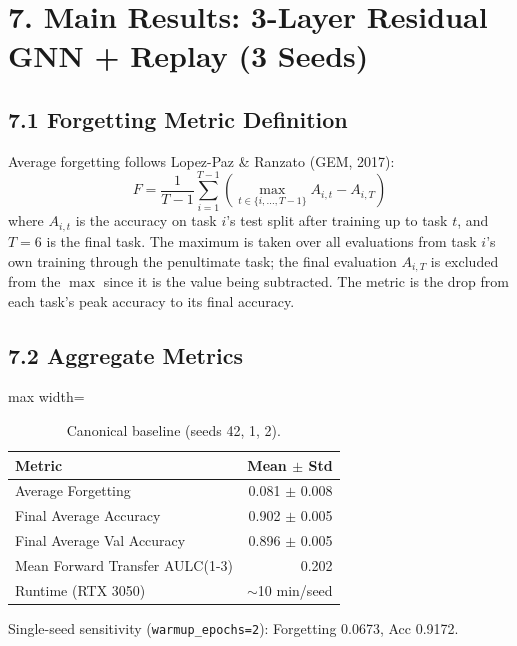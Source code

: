 \documentclass[11pt,a4paper]{article}
\begin{document}
\section*{7. Main Results: 3-Layer Residual GNN + Replay (3 Seeds)}

\subsection*{7.1 Forgetting Metric Definition}
Average forgetting follows Lopez-Paz \& Ranzato (GEM, 2017):
\begin{equation}
F = \frac{1}{T-1}\sum_{i=1}^{T-1} \left( \max_{t \in \{i,\dots,T-1\}} A_{i,t} - A_{i,T} \right)
\end{equation}
where $A_{i,t}$ is the accuracy on task $i$'s test split after training up to task $t$, and $T=6$ is the final task. The maximum is taken over all evaluations from task $i$'s own training through the penultimate task; the final evaluation $A_{i,T}$ is excluded from the $\max$ since it is the value being subtracted. The metric is the drop from each task's peak accuracy to its final accuracy.

\subsection*{7.2 Aggregate Metrics}

\begin{table}[H]
\centering
\caption{Canonical baseline (seeds 42, 1, 2).}
\label{tab:canonical-baseline}
\begin{adjustbox}{max width=\textwidth}
\begin{tabular}{lr}
\toprule
Metric & Mean $\pm$ Std \\
\midrule
Average Forgetting & \num{0.081} $\pm$ \num{0.008} \\
Final Average Accuracy & \num{0.902} $\pm$ \num{0.005} \\
Final Average Val Accuracy & \num{0.896} $\pm$ \num{0.005} \\
Mean Forward Transfer AULC(1-3) & \num{0.202} \\
Runtime (RTX 3050) & $\sim$10 min/seed \\
\bottomrule
\end{tabular}
\end{adjustbox}
\end{table}

Single-seed sensitivity (\texttt{warmup\_epochs=2}): Forgetting \num{0.0673}, Acc \num{0.9172}.
\end{document}
